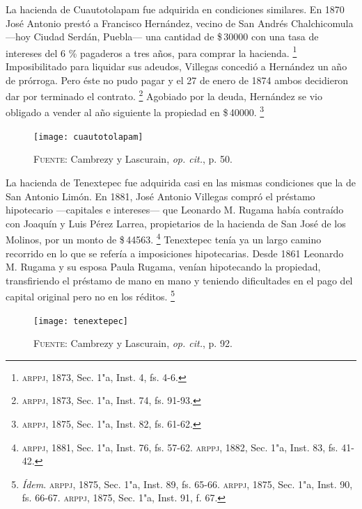 \documentclass[14pt,twoside,final]{extbook} %
\let\oldfootnote\footnote
\renewcommand\footnote[1]{%
\oldfootnote{\hspace{1mm}#1}}
\begin{document}
La hacienda de Cuautotolapam fue adquirida en condiciones similares. En 1870 José Antonio prestó a Francisco Hernández, vecino de San Andrés Chalchicomula ---hoy Ciudad Serdán, Puebla--- una cantidad de \$\,30000 con una tasa de intereses del 6 \% pagaderos a tres años, para comprar la hacienda.\footnote{\textsc{arppj}, 1873, Sec. 1"a, Inst. 4, fs. 4-6.} Imposibilitado para liquidar sus adeudos, Villegas concedió a Hernández un año de prórroga. Pero éste no pudo pagar y el 27 de enero de 1874 ambos decidieron dar por terminado el contrato.\footnote{\textsc{arppj}, 1873, Sec. 1"a, Inst. 74, fs. 91-93.} Agobiado por la deuda, Hernández se vio obligado a vender al año siguiente la propiedad en \$\,40000.\footnote{\textsc{arppj}, 1875, Sec. 1"a, Inst. 82, fs. 61-62.}
\begin{figure}
\centering
\texttt{[image: cuautotolapam]}
\caption[Plano de la hacienda de Cuautotolapam]{\textsc{Fuente:} Cambrezy y Lascurain, \emph{op. cit.}, p. 50.}
\label{fig:hda-cuatotolapam}
\end{figure}

La hacienda de Tenextepec fue adquirida casi en las mismas condiciones que la de San Antonio Limón. En 1881, José Antonio Villegas compró el préstamo hipotecario ---capitales e intereses--- que Leonardo M. Rugama había contraído con Joaquín y Luis Pérez Larrea, propietarios de la hacienda de San José de los Molinos, por un monto de \$\,44563.\footnote{\textsc{arppj}, 1881, Sec. 1"a, Inst. 76, fs. 57-62. \textsc{arppj}, 1882, Sec. 1"a, Inst. 83, fs. 41-42.} Tenextepec tenía ya un largo camino recorrido en lo que se refería a imposiciones hipotecarias. Desde 1861 Leonardo M. Rugama y su esposa Paula Rugama, venían hipotecando la propiedad, transfiriendo el préstamo de mano en mano y teniendo dificultades en el pago del capital original pero no en los réditos.\footnote{\emph{Ídem}. \textsc{arppj}, 1875, Sec. 1"a, Inst. 89, fs. 65-66. \textsc{arppj}, 1875, Sec. 1"a, Inst. 90, fs. 66-67. \textsc{arppj}, 1875, Sec. 1"a, Inst. 91, f. 67.}
\begin{figure}
\centering
\texttt{[image: tenextepec]}
\caption[Plano de la hacienda de Tenextepec]{\textsc{Fuente:} Cambrezy y Lascurain, \emph{op. cit.}, p. 92.}
\label{fig:hda-tenextepec}
\end{figure}
\end{document}
